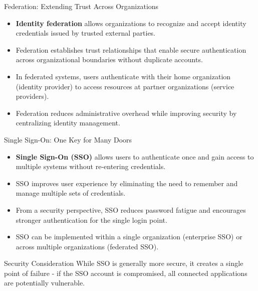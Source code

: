 \documentclass{beamer}
\begin{document}
\begin{frame}{Federation: Extending Trust Across Organizations}
    \begin{itemize}
        \item \textbf{Identity federation} allows organizations to recognize and accept identity credentials issued by trusted external parties.
        \item Federation establishes trust relationships that enable secure authentication across organizational boundaries without duplicate accounts.
        \item In federated systems, users authenticate with their home organization (identity provider) to access resources at partner organizations (service providers).
        \item Federation reduces administrative overhead while improving security by centralizing identity management.
    \end{itemize}
    
    \begin{center}
    \end{center}
\end{frame}

\begin{frame}{Single Sign-On: One Key for Many Doors}
    \begin{itemize}
        \item \textbf{Single Sign-On (SSO)} allows users to authenticate once and gain access to multiple systems without re-entering credentials.
        \item SSO improves user experience by eliminating the need to remember and manage multiple sets of credentials.
        \item From a security perspective, SSO reduces password fatigue and encourages stronger authentication for the single login point.
        \item SSO can be implemented within a single organization (enterprise SSO) or across multiple organizations (federated SSO).
    \end{itemize}
    
    \begin{alertblock}{Security Consideration}
        While SSO is generally more secure, it creates a single point of failure - if the SSO account is compromised, all connected applications are potentially vulnerable.
    \end{alertblock}
\end{frame}
\end{document}
